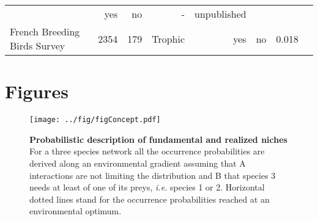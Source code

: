 \begin{longtable}[]{@{}lrrrrrrr@{}}
\begin{minipage}[t]{0.11\columnwidth}
\end{minipage} & \begin{minipage}[t]{0.05\columnwidth}\raggedleft\strut
yes\strut
\end{minipage} & \begin{minipage}[t]{0.04\columnwidth}\raggedleft\strut
no\strut
\end{minipage} & \begin{minipage}[t]{0.06\columnwidth}\raggedleft\strut
-\strut
\end{minipage} & \begin{minipage}[t]{0.22\columnwidth}\raggedleft\strut
unpublished\strut
\end{minipage}\tabularnewline
\begin{minipage}[t]{0.15\columnwidth}\raggedright\strut
French Breeding Birds Survey\strut
\end{minipage} & \begin{minipage}[t]{0.07\columnwidth}\raggedleft\strut
2354\strut
\end{minipage} & \begin{minipage}[t]{0.07\columnwidth}\raggedleft\strut
179\strut
\end{minipage} & \begin{minipage}[t]{0.11\columnwidth}\raggedleft\strut
Trophic\strut
\end{minipage} & \begin{minipage}[t]{0.05\columnwidth}\raggedleft\strut
yes\strut
\end{minipage} & \begin{minipage}[t]{0.04\columnwidth}\raggedleft\strut
no\strut
\end{minipage} & \begin{minipage}[t]{0.06\columnwidth}\raggedleft\strut
0.018\strut
\end{minipage} & \begin{minipage}[t]{0.22\columnwidth}\raggedleft\strut
\citet{Gauzere2015}\strut
\end{minipage}\tabularnewline
\bottomrule
\end{longtable}

\newpage

\section{Figures}\label{figures}

\begin{figure}[htbp]
\centering
\texttt{[image: ../fig/figConcept.pdf]}
\caption{\textbf{Probabilistic description of fundamental and realized
niches} For a three species network all the occurrence probabilities are
derived along an environmental gradient assuming that A interactions are
not limiting the distribution and B that species 3 needs at least of one
of its preys, \emph{i.e.} species 1 or 2. Horizontal dotted lines stand
for the occurrence probabilities reached at an environmental
optimum.\label{fig:box1}}
\end{figure}

